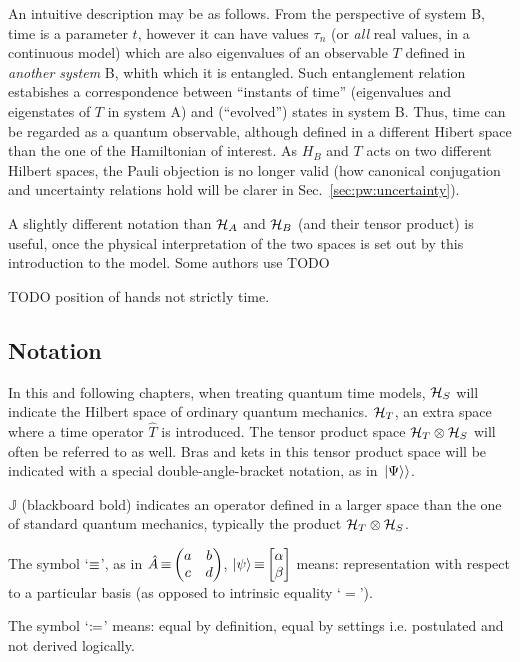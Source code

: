 An intuitive description may be as follows.
From the perspective of system B, time is a parameter $t$, however it can have values
$\tau_n$ (or \emph{all} real values, in a continuous model)
which are also eigenvalues of an observable $T$ defined in \emph{another system} B,
whith which it is entangled. Such entanglement relation estabishes a correspondence
between ``instants of time'' (eigenvalues and eigenstates of $T$ in system A)
and (``evolved'') states in system B. Thus, time can be regarded as a quantum observable,
although defined in a different Hibert space than the one of the Hamiltonian of interest.
As $H_B$ and $T$ acts on two different Hilbert spaces, the Pauli objection is no longer valid
(how canonical conjugation and uncertainty relations hold will be clarer in Sec.~\ref{sec:pw:uncertainty}).

A slightly different notation than $\mathcal{H}_A$ and $\mathcal{H}_B$ (and their tensor product)
is useful, once
the physical interpretation of the two spaces is set out by this introduction to the model.
Some authors use TODO

TODO position of hands not strictly time.

\subsection*{Notation}

In this and following chapters, when treating quantum time models,
$\mathcal{H}_S$ will indicate the Hilbert space of ordinary quantum mechanics.
$\mathcal{H}_T$, an extra space where a time operator $\hat{T}$ is introduced. The tensor
product space $\mathcal{H}_T \otimes \mathcal{H}_S$
will often be referred to as well.
Bras and kets in this tensor product space will be indicated with a special double-angle-bracket
notation, as in $\left.\left| \Psi \right\rangle\right\rangle$.

${\mathbb{J}}$ (blackboard bold) indicates an  operator defined in
a larger space than the one of standard quantum mechanics,
typically the product $\mathcal{H}_T \otimes \mathcal{H}_S$.

The symbol `$\operatorname*{\equiv}$', as in $\hat{A} \repr \mqty(a&b\\c&d)$, $\ket{\psi} \repr \mqty[\alpha \\ \beta]$
means: representation with respect to a particular basis (as opposed to intrinsic equality `$=$').

The symbol `$\coloneqq$'
means: equal by definition, equal by settings i.e. postulated and not derived logically.
